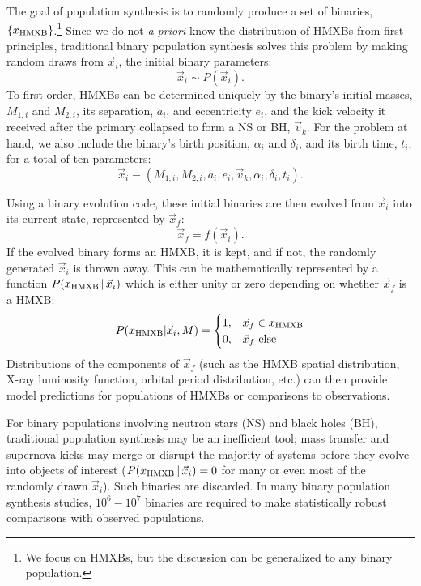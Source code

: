 \documentclass[12pt, preprint]{aastex}
\newcommand{\given}{\,|\,}
\begin{document}
The goal of population synthesis is to randomly produce a set of binaries, $\{x_{\rm HMXB}\}$.\footnote{We focus on HMXBs, but the discussion can be generalized to any binary population.} Since we do not {\it a priori} know the distribution of HMXBs from first principles, traditional binary population synthesis solves this problem by making random draws from $\vec{x}_i$, the initial binary parameters:
\begin{equation}
\vec{x}_i \sim P(\vec{x}_i).
\end{equation}
To first order, HMXBs can be determined uniquely by the binary's initial masses, $M_{1,i}$ and $M_{2,i}$, its separation, $a_i$, and eccentricity $e_i$, and the kick velocity it received after the primary collapsed to form a NS or BH, $\vec{v}_k$. For the problem at hand, we also include the binary's birth position, $\alpha_i$ and $\delta_i$, and its birth time, $t_i$, for a total of ten parameters:
\begin{equation}
\vec{x}_i \equiv ( M_{1,i}, M_{2,i}, a_i, e_i, \vec{v}_k, \alpha_i, \delta_i, t_i ). \label{eq:x_i}
\end{equation}


Using a binary evolution code, these initial binaries are then evolved from $\vec{x}_i$ into its current state, represented by $\vec{x}_f$:
\begin{equation}
\vec{x}_f = f(\vec{x}_i). \label{eq:xf_xi}
\end{equation}
If the evolved binary forms an HMXB, it is kept, and if not, the randomly generated $\vec{x}_i$ is thrown away. This can be mathematically represented by a function $P(x_{\rm HMXB} \given \vec{x}_i)$ which is either unity or zero depending on whether $\vec{x}_f$ is a HMXB:
\begin{equation}
P(x_{\rm HMXB} | \vec{x}_i, M) = 
\begin{cases}
1, & \vec{x}_f \in x_{\rm HMXB} \\
0, & \vec{x}_f\ {\rm else}
\end{cases}
\end{equation}
Distributions of the components of $\vec{x}_f$ (such as the HMXB spatial distribution, X-ray luminosity function, orbital period distribution, etc.) can then provide model predictions for populations of HMXBs or comparisons to observations.




For binary populations involving neutron stars (NS) and black holes (BH), traditional population synthesis may be an inefficient tool; mass transfer and supernova kicks may merge or disrupt the majority of systems before they evolve into objects of interest ($P(x_{\rm HMXB} \given \vec{x}_i) = 0$ for many or even most of the randomly drawn $\vec{x}_i$). Such binaries are discarded. In many binary population synthesis studies, $10^6-10^7$ binaries are required to make statistically robust comparisons with observed populations.
\end{document}
